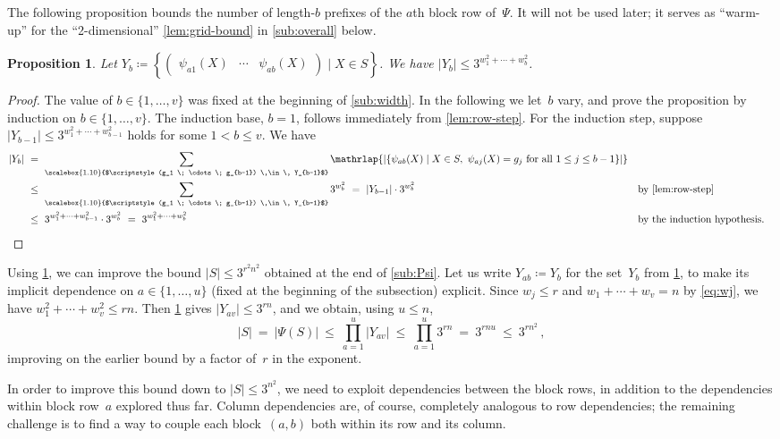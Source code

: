 \documentclass{lmcs}
\newtheorem{proposition}[thm]{Proposition}
\theoremstyle{definition}
\newcommand{\slim}[1]{{\scalebox{1.10}{$\scriptstyle #1$}}}
\begin{document}
The following proposition bounds the number of length-$b$ prefixes of the $a$th block row of~$\Psi$.
It will not be used later; it serves as ``warm-up'' for the ``2-dimensional'' \cref{lem:grid-bound} in \cref{sub:overall} below.
\begin{proposition} \label{prop:row-bound} 
Let
$Y_b \coloneqq \left\{\begin{pmatrix} \psi_{a 1}(X) & \cdots & \psi_{a b}(X) \end{pmatrix} \mid X \in S\right\}$.
We have $|Y_b| \le 3^{w_1^2 + \cdots + w_b^2}$.
\end{proposition}
\begin{proof}
The value of $b \in \{1, \ldots, v\}$ was fixed at the beginning of \cref{sub:width}.
In the following we let~$b$ vary, and prove the proposition by induction on $b \in \{1, \ldots, v\}$.
The induction base, $b=1$, follows immediately from \cref{lem:row-step}.
For the induction step, suppose $|Y_{b-1}| \le 3^{w_1^2 + \cdots + w_{b-1}^2}$ holds for some $1 < b \le v$.
We have
\begin{align*}
|Y_b| \ 
& = \ \sum_{\slim{(g_1 \; \cdots \; g_{b-1}) \,\in\, Y_{b-1}}} \mathrlap{|\{\psi_{a b}(X) \mid X \in S, \ \psi_{a j}(X) = g_j \text{ for all } 1 \le j \le b-1\}|} \\
& \le \ \sum_{\slim{(g_1 \; \cdots \; g_{b-1}) \,\in\, Y_{b-1}}} 3^{w_b^2} \ = \ |Y_{b-1}| \cdot 3^{w_b^2} && \text{by \cref{lem:row-step}} \\
& \le \ 3^{w_1^2 + \cdots + w_{b-1}^2} \cdot 3^{w_b^2} \ = \ 3^{w_1^2 + \cdots + w_{b}^2} && \text{by the induction hypothesis.} \qedhere 
\end{align*}
\end{proof}

Using \cref{prop:row-bound}, we can improve the bound $|S| \le 3^{r^2 n^2}$ obtained at the end of \cref{sub:Psi}.
Let us write $Y_{a b} \coloneqq Y_b$ for the set~$Y_b$ from \cref{prop:row-bound}, to make its implicit dependence on $a \in \{1, \ldots, u\}$ (fixed at the beginning of the subsection) explicit.
Since $w_j \le r$ and $w_1 + \cdots + w_v = n$ by \cref{eq:wj}, we have $w_1^2 + \cdots + w_v^2 \le r n$.
Then \cref{prop:row-bound} gives $|Y_{a v}| \le 3^{r n}$, and we obtain, using $u \le n$,
\[
|S| \ = \ |\Psi(S)| \ \le \ \prod_{a=1}^{u} |Y_{a v}| \ \le \ \prod_{a=1}^{u} 3^{r n} \ = \ 3^{r n u} \ \le \ 3^{r n^2}\,,
\]
improving on the earlier bound by a factor of~$r$ in the exponent.

In order to improve this bound down to $|S| \le 3^{n^2}$, we need to exploit dependencies between the block rows, in addition to the dependencies within block row~$a$ explored thus far.
Column dependencies are, of course, completely analogous to row dependencies; the remaining challenge is to find a way to couple each block~$(a,b)$ both within its row and its column.
\end{document}

